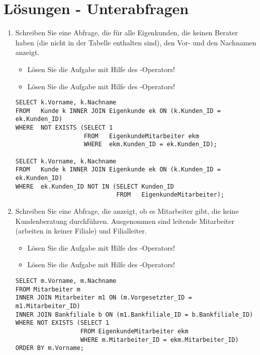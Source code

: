 \clearpage
    \section{Lösungen - Unterabfragen}
      \begin{enumerate}
        \item Schreiben Sie eine Abfrage, die für alle Eigenkunden, die keinen
        Berater haben (die nicht in der Tabelle
         enthalten sind), den Vor- und den
        Nachnamen anzeigt.
        \begin{itemize}
          \item Lösen Sie die Aufgabe mit Hilfe des -Operators!
          \item Lösen Sie die Aufgabe mit Hilfe des -Operators!
        \end{itemize}
        \begin{msoraclesql}[\FALSE]
        \end{msoraclesql}
        \begin{lstlisting}[language=oracle_sql]
SELECT k.Vorname, k.Nachname
FROM   Kunde k INNER JOIN Eigenkunde ek ON (k.Kunden_ID = ek.Kunden_ID)
WHERE  NOT EXISTS (SELECT 1
                   FROM   EigenkundeMitarbeiter ekm
                   WHERE  ekm.Kunden_ID = ek.Kunden_ID);

SELECT k.Vorname, k.Nachname
FROM   Kunde k INNER JOIN Eigenkunde ek ON (k.Kunden_ID = ek.Kunden_ID)
WHERE  ek.Kunden_ID NOT IN (SELECT Kunden_ID
                            FROM   EigenkundeMitarbeiter);
        \end{lstlisting}
        \item Schreiben Sie eine Abfrage, die anzeigt, ob es Mitarbeiter gibt, die keine Kundenberatung durchführen.
        Ausgenommen sind leitende Mitarbeiter (arbeiten in keiner Filiale) und Filialleiter.
        \begin{itemize}
          \item Lösen Sie die Aufgabe mit Hilfe des -Operators!
          \item Lösen Sie die Aufgabe mit Hilfe des -Operators!
        \end{itemize}
        \begin{msoraclesql}[\FALSE]
        \end{msoraclesql}
        \begin{lstlisting}[language=oracle_sql]
SELECT m.Vorname, m.Nachname
FROM Mitarbeiter m
INNER JOIN Mitarbeiter m1 ON (m.Vorgesetzter_ID = m1.Mitarbeiter_ID)
INNER JOIN Bankfiliale b ON (m1.Bankfiliale_ID = b.Bankfiliale_ID)
WHERE NOT EXISTS (SELECT 1
                  FROM EigenkundeMitarbeiter ekm
                  WHERE m.Mitarbeiter_ID = ekm.Mitarbeiter_ID)
ORDER BY m.Vorname;


\end{lstlisting}
\end{enumerate}
